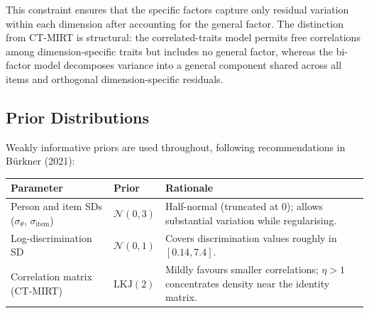 \documentclass[
  man,
  floatsintext,
  longtable,
  nolmodern,
  notxfonts,
  notimes,
  colorlinks=true,linkcolor=blue,citecolor=blue,urlcolor=blue]{apa7}
\begin{document}
This constraint ensures that the specific factors capture only residual
variation within each dimension after accounting for the general factor.
The distinction from CT-MIRT is structural: the correlated-traits model
permits free correlations among dimension-specific traits but includes
no general factor, whereas the bi-factor model decomposes variance into
a general component shared across all items and orthogonal
dimension-specific residuals.

\subsection{Prior Distributions}\label{prior-distributions}

Weakly informative priors are used throughout, following recommendations
in Bürkner (2021):

\fontsize{10.5pt}{12.6pt}\selectfont

\begin{table}

{\caption{{Prior distributions for all model
parameters.}{\label{tbl-priors}}}
\vspace{-20pt}}

\begin{longtable}[]{@{}
  >{\raggedright\arraybackslash}p{}
  >{\raggedright\arraybackslash}p{}
  >{\raggedright\arraybackslash}p{}@{}}
\toprule\noalign{}
\begin{minipage}[b]{\linewidth}\raggedright
Parameter
\end{minipage} & \begin{minipage}[b]{\linewidth}\raggedright
Prior
\end{minipage} & \begin{minipage}[b]{\linewidth}\raggedright
Rationale
\end{minipage} \\
\midrule\noalign{}
\endhead
\bottomrule\noalign{}
\endlastfoot
Person and item SDs (\(\sigma_\theta\), \(\sigma_{\text{item}}\)) &
\(\mathcal{N}(0, 3)\) & Half-normal (truncated at 0); allows substantial
variation while regularising. \\
Log-discrimination SD & \(\mathcal{N}(0, 1)\) & Covers discrimination
values roughly in \([0.14, 7.4]\). \\
Correlation matrix (CT-MIRT) & \(\text{LKJ}(2)\) & Mildly favours
smaller correlations; \(\eta > 1\) concentrates density near the
identity matrix. \\
\end{longtable}

\end{table}
\end{document}
